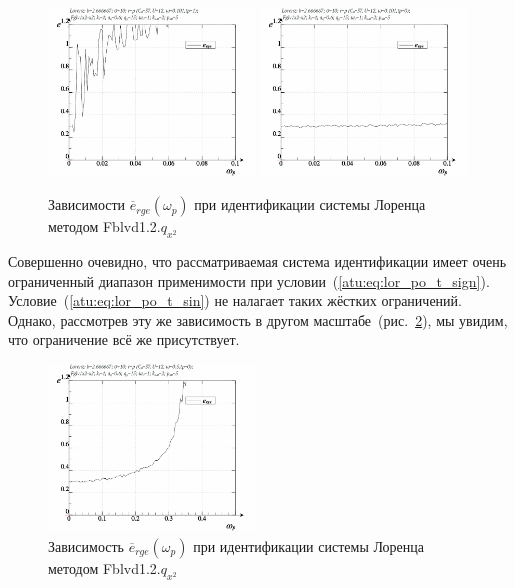 \begin{figure}[h!]
  \centerline{
    \includegraphics[width=0.49\textwidth]{p/cha/lor/Fblvd1_2/Fblvd1_2-p_omega_p_e_1_.png}
    \hfill
    \includegraphics[width=0.49\textwidth]{p/cha/lor/Fblvd1_2/Fblvd1_2-p_omega_p_e_0_.png}
  }
  \caption{Зависимости $\overline{e}_{rge}(\omega_p)$ при идентификации системы Лоренца методом Fblvd1.2.$q_{x^2}$}
  \label{atu:f:lor_Fblvd1_e_omega_p}
\end{figure}

Совершенно очевидно, что рассматриваемая система идентификации
имеет очень ограниченный диапазон применимости при условии~(\ref{atu:eq:lor_po_t_sign}).
Условие~(\ref{atu:eq:lor_po_t_sin}) не налагает таких жёстких ограничений.
Однако, рассмотрев эту же зависимость в другом масштабе~(рис.~\ref{atu:f:lor_Fblvd1_e_omega_p_wide}),
мы увидим, что ограничение всё же присутствует.

\begin{figure}[h!]
  \centerline{
    \includegraphics[width=0.49\textwidth]{p/cha/lor/Fblvd1_2/Fblvd1_2-p_omega_p_e_0_wide.png}
  }
  \caption{Зависимость $\overline{e}_{rge}(\omega_p)$ при идентификации системы Лоренца методом Fblvd1.2.$q_{x^2}$}
  \label{atu:f:lor_Fblvd1_e_omega_p_wide}
\end{figure}

